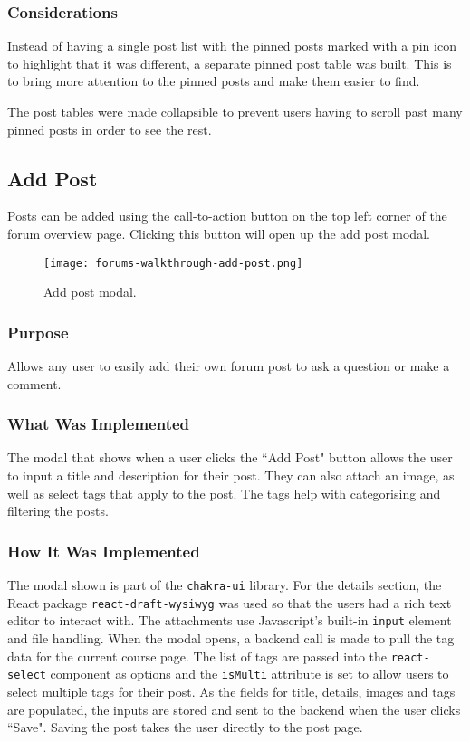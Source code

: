\subsubsection{Considerations}
Instead of having a single post list with the pinned posts marked with a pin icon to highlight that it was different, a separate pinned post table was built.
This is to bring more attention to the pinned posts and make them easier to find.

The post tables were made collapsible to prevent users having to scroll past many pinned posts in order to see the rest.

\subsection{Add Post}
Posts can be added using the call-to-action button on the top left corner of the forum overview page.
Clicking this button will open up the add post modal.

\begin{figure}[h!]
    \texttt{[image: forums-walkthrough-add-post.png]}
    \centering
    \caption{Add post modal.}
\end{figure}

\subsubsection{Purpose}
Allows any user to easily add their own forum post to ask a question or make a comment.

\subsubsection{What Was Implemented}
The modal that shows when a user clicks the ``Add Post" button allows the user to input a title and description for their post.
They can also attach an image, as well as select tags that apply to the post. The tags help with categorising and filtering the posts.

\subsubsection{How It Was Implemented}
The modal shown is part of the \texttt{chakra-ui} library.
For the details section, the React package \texttt{react-draft-wysiwyg} was used so that the users had a rich text editor to interact with.
The attachments use Javascript's built-in \texttt{input} element and file handling.
When the modal opens, a backend call is made to pull the tag data for the current course page.
The list of tags are passed into the \texttt{react-select} component as options and the \texttt{isMulti} attribute is set to allow users to select multiple tags for their post.
As the fields for title, details, images and tags are populated, the inputs are stored and sent to the backend when the user clicks ``Save".
Saving the post takes the user directly to the post page.

